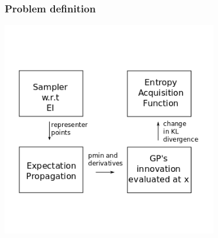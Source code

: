 \documentclass[10pt,handout]{beamer}
\begin{document}
\begin{frame}
\frametitle{Problem definition}

\begin{center}
\includegraphics[width=0.7\textwidth]{robo_entropy.png}
\end{center}
\end{frame}
\end{document}
